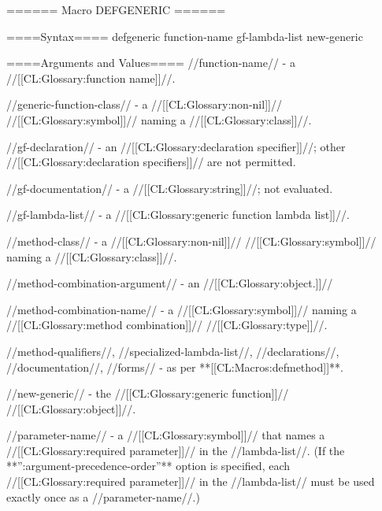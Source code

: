 ====== Macro DEFGENERIC ======

====Syntax====
\DefmacWithValuesNewline defgeneric {function-name gf-lambda-list } {new-generic}

 

====Arguments and Values====
//function-name// - a //[[CL:Glossary:function name]]//.

//generic-function-class// - a //[[CL:Glossary:non-nil]]// //[[CL:Glossary:symbol]]// naming a //[[CL:Glossary:class]]//.

//gf-declaration// - an  //[[CL:Glossary:declaration specifier]]//; other //[[CL:Glossary:declaration specifiers]]// are not permitted.

//gf-documentation// - a //[[CL:Glossary:string]]//; not evaluated.

//gf-lambda-list// - a //[[CL:Glossary:generic function lambda list]]//.

//method-class// - a //[[CL:Glossary:non-nil]]// //[[CL:Glossary:symbol]]// naming a //[[CL:Glossary:class]]//.

//method-combination-argument// - an //[[CL:Glossary:object.]]//

//method-combination-name// - a //[[CL:Glossary:symbol]]// naming a //[[CL:Glossary:method combination]]// //[[CL:Glossary:type]]//.

//method-qualifiers//, //specialized-lambda-list//, //declarations//, //documentation//, //forms// - as per **[[CL:Macros:defmethod]]**.

//new-generic// - the //[[CL:Glossary:generic function]]// //[[CL:Glossary:object]]//.

//parameter-name// - a //[[CL:Glossary:symbol]]// that names a //[[CL:Glossary:required parameter]]// in the //lambda-list//. (If the **'':argument-precedence-order''** option is specified, each //[[CL:Glossary:required parameter]]// in the //lambda-list// must be used exactly once as a //parameter-name//.)

